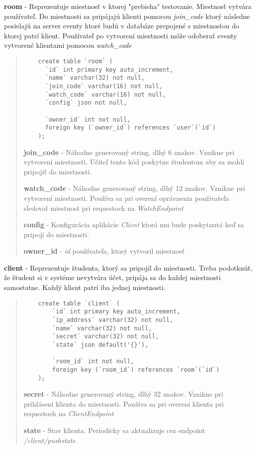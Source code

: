 \documentclass{article}
\newcommand{\filedesc}[1]{\vspace{0.3cm} \noindent \textbf{#1}}
\newcommand{\file}[1]{\emph{#1}}
\begin{document}
\filedesc{room} - Reprezentuje miestnosť v ktorej "prebieha" testovanie. Miestnosť vytvára používateľ. Do miestnosti sa pripájajú klienti pomocou \emph{join{\_}code} ktorý následne posielajú na server eventy ktoré budú v databáze prepojené s miestnosťou do ktorej patrí klient. Používateľ po vytvorení miestnosti môže odoberať eventy vytvorené klientami pomocou \emph{watch{\_}code}

\begin{quote}
  
  \begin{verbatim}
    create table `room` (
      `id` int primary key auto_increment,
      `name` varchar(32) not null,
      `join_code` varchar(16) not null,
      `watch_code` varchar(16) not null,
      `config` json not null,

      `owner_id` int not null,
      foreign key (`owner_id`) references `user`(`id`)
    );
  \end{verbatim}

  \filedesc{join{\_}code} - Náhodne generovaný string, dlhý 6 znakov. Vznikne pri vytvorení miestnosti. Učiteľ tento kód poskytne študentom aby sa mohli pripojiť do miestnosti.

  \filedesc{watch{\_}code} - Náhodne generovaný string, dlhý 12 znakov. Vznikne pri vytvorení miestnosti. Používa sa pri overení oprávnenia používateľa sledovať miestnosť pri requestoch na \emph{WatchEndpoint}

  \filedesc{config} - Konfigurácia aplikácie \emph{Client} ktorá mu bude poskytnutá keď sa pripojí do miestnosti.
  
  \filedesc{owner{\_}id} - \emph{id} používateľa, ktorý vytvoril miestnosť

\end{quote}

\filedesc{client} - Reprezentuje študenta, ktorý sa pripojil do miestnosti. Treba podotknúť, že študent si v systéme nevytvára účet, pripája sa do každej miestnosti samostatne. Každý klient patrí iba jednej miestnosti.

\begin{quote}
  \begin{verbatim}
    create table `client` (
        `id` int primary key auto_increment,
        `ip_address` varchar(32) not null,
        `name` varchar(32) not null,
        `secret` varchar(32) not null,
        `state` json default('{}'),

        `room_id` int not null,
        foreign key (`room_id`) references `room`(`id`)
    );
  \end{verbatim}

  \filedesc{secret} - Náhodne generovaný string, dlhý 32 znakov. Vznikne pri prihlásení klienta do miestnosti. Používa sa pri overení klienta pri requestoch na \emph{ClientEndpoint}

  \filedesc{state} - Stav klienta. Periodicky sa aktualizuje cez endpoint \file{/client/pushstate}.

\end{quote}
\end{document}
